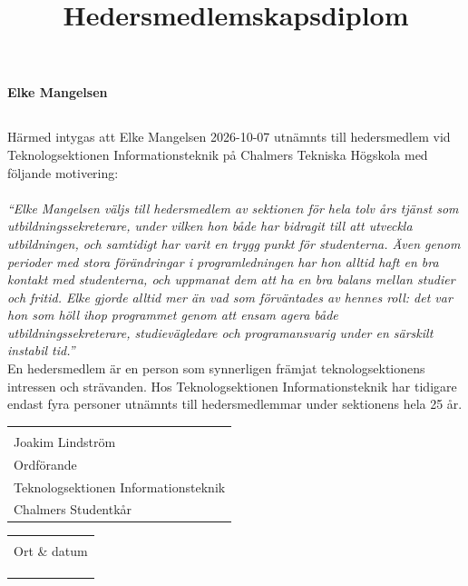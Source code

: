 \documentclass[11pt, noincludeaddress, nopagination]{classes/cthit}
\makeatletter
\newcommand{\sign}[4]{%
  \begin{tabular}[t]{@{}l@{}}
  \makebox[6.5cm]{\dotfill}\\
  \strut#1\strut \\
  \strut#2\strut \\
  \strut#3\strut \\
  \strut#4\strut \\
  \end{tabular}%
}
\makeatother
\begin{document}
\title{Hedersmedlemskapsdiplom}

\makeheadfoot%

\makesimpletitle
\begin{center}
\textbf{\Huge{Elke Mangelsen}}
\end{center}
\vspace{1cm}
\subsection*{}
Härmed intygas att Elke Mangelsen 2026-10-07 utnämnts till hedersmedlem vid Teknologsektionen Informationsteknik på Chalmers Tekniska Högskola med följande motivering:
\\
\\
\textit{
``Elke Mangelsen väljs till hedersmedlem av sektionen för hela tolv års tjänst som utbildningssekreterare, under vilken hon både har bidragit till att utveckla utbildningen, och samtidigt har varit en trygg punkt för studenterna. Även genom perioder med stora förändringar i programledningen har hon alltid haft en bra kontakt med studenterna, och uppmanat dem att ha en bra balans mellan studier och fritid. Elke gjorde alltid mer än vad som förväntades av hennes roll: det var hon som höll ihop programmet genom att ensam agera både utbildningssekreterare, studievägledare och programansvarig under en särskilt instabil tid.''
}
\\

En hedersmedlem är en person som synnerligen främjat teknologsektionens intressen och strävanden. Hos Teknologsektionen Informationsteknik har tidigare endast fyra personer utnämnts till hedersmedlemmar under sektionens hela 25 år.

\vspace{3cm} 

\noindent
  \begin{minipage}[t]{0.5\linewidth}
    \raggedright
    \sign{Joakim Lindström}{Ordförande}{Teknologsektionen Informationsteknik}{Chalmers Studentkår}
  \end{minipage}%
  \hfill
  \begin{minipage}[t]{0.5\linewidth}
  \sign{Ort \& datum}{}{}{}
  \end{minipage}
\end{document}
